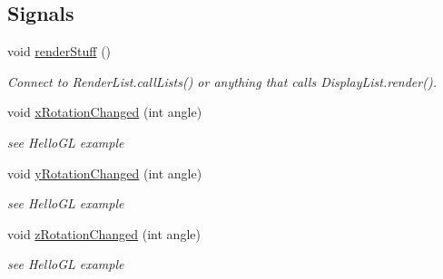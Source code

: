 \subsection*{Signals}
\begin{DoxyCompactItemize}
\item 
void \hyperlink{class_g_l_widget_aee1d7cc90f004a93605b3aa795efd75e}{renderStuff} ()
\begin{DoxyCompactList}\small\item\em Connect to RenderList.callLists() or anything that calls DisplayList.render(). \item\end{DoxyCompactList}\item 
void \hyperlink{class_g_l_widget_a3a557b9cd96f7b89661ceaa567c91640}{xRotationChanged} (int angle)
\begin{DoxyCompactList}\small\item\em see HelloGL example \item\end{DoxyCompactList}\item 
void \hyperlink{class_g_l_widget_ad47d672d0124b995e82551a95b59badb}{yRotationChanged} (int angle)
\begin{DoxyCompactList}\small\item\em see HelloGL example \item\end{DoxyCompactList}\item 
void \hyperlink{class_g_l_widget_ab2035753b19b46105020d6045ac75a79}{zRotationChanged} (int angle)
\begin{DoxyCompactList}\small\item\em see HelloGL example \item\end{DoxyCompactList}\end{DoxyCompactItemize}
